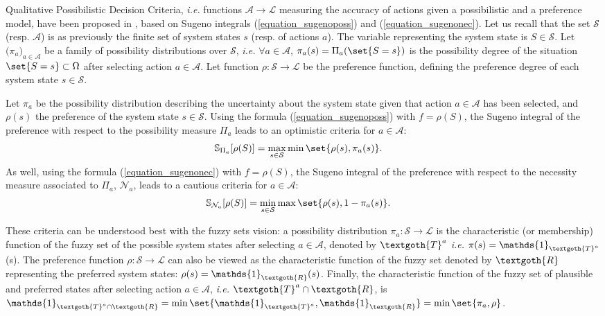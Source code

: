 Qualitative Possibilistic Decision Criteria,
\textit{i.e.} functions $\mathcal{A} \rightarrow \mathcal{L}$ 
measuring the accuracy of actions given a possibilistic and a preference model,
have been proposed in \cite{DBLP:journals/ijar/SabbadinFL98,DBLP:journals/eor/DuboisPS01,Dubois95possibilitytheory},
based on Sugeno integrals (\ref{equation_sugenoposs}) and (\ref{equation_sugenonec}).
Let us recall that the set $\mathcal{S}$ (resp. $\mathcal{A}$) 
is as previously the finite set of system states $s$ (resp. of actions $a$).
The variable representing the system state is $S \in \mathcal{S}$.
Let $\big(\pi_a\big)_{a \in \mathcal{A}}$ be a family of 
possibility distributions over $\mathcal{S}$,
\textit{i.e.} $\forall a \in \mathcal{A}$, $\pi_a(s) = \Pi_a( \set{S = s} )$
is the possibility degree of the situation $\set{S=s} \subset \Omega$ after selecting action $a \in \mathcal{A}$. 
Let function $\rho: \mathcal{S} \rightarrow \mathcal{L}$ be the preference function, 
defining the preference degree of each system state $s \in \mathcal{S}$.

\begin{Def}
Let $\pi_a$ be the possibility distribution 
describing the uncertainty about the system state
given that action $a \in \mathcal{A}$ has been selected, 
and $\rho(s)$ the preference of the system state $s \in \mathcal{S}$.
Using the formula (\ref{equation_sugenoposs}) with $f=\rho(S)$, 
the Sugeno integral of the preference with respect to the possibility measure $\Pi_a$ 
leads to an optimistic criteria for $a \in \mathcal{A}$:
\label{def_qualcrit}
\begin{align}
\label{equation_critopt} \mathbb{S}_{\Pi_a}[\rho(S)] &= \max_{s \in \mathcal{S}} \min \set{ \rho(s), \pi_a(s) }.
\end{align}
As well, using the formula (\ref{equation_sugenonec}) with $f=\rho(S)$, 
the Sugeno integral of the preference with respect to the necessity measure associated to $\Pi_a$, $\mathcal{N}_a$, 
leads to a cautious criteria for $a \in \mathcal{A}$:
\begin{align}
\label{equation_critpess} \mathbb{S}_{\mathcal{N}_a}[\rho(S)] &= \min_{s \in \mathcal{S}} \max \set{ \rho(s), 1-\pi_a(s) }.
\end{align}
\end{Def}

These criteria can be understood best with the fuzzy sets vision:
a possibility distribution $\pi_a: \mathcal{S} \rightarrow \mathcal{L}$ 
is the characteristic (or membership) function of the fuzzy set of the possible system states 
after selecting $a \in \mathcal{A}$,
denoted by $\textgoth{T}^{a}$ \textit{i.e.} $\pi(s) = \mathds{1}_{\textgoth{T}^a}$(s).
The preference function $\rho: \mathcal{S} \rightarrow \mathcal{L}$ 
can also be viewed as the characteristic function 
of the fuzzy set denoted by $\textgoth{R}$ representing the preferred system states:
$\rho(s) = \mathds{1}_{\textgoth{R}}(s)$.
Finally, the characteristic function of the fuzzy set 
of plausible and preferred states after selecting action $a \in \mathcal{A}$, \textit{i.e.} $\textgoth{T}^a \cap \textgoth{R}$,
is $\mathds{1}_{\textgoth{T}^a \cap \textgoth{R}} = \min \set{ \mathds{1}_{\textgoth{T}^a}, \mathds{1}_{\textgoth{R}} }
= \min \set{ \pi_a, \rho }$.

